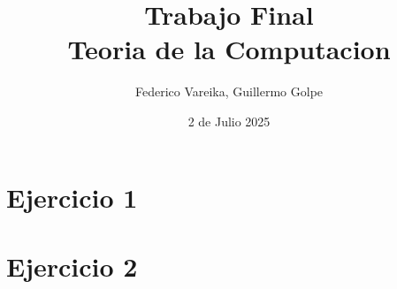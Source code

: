 \documentclass[12pt, a4paper]{article}
\title{
    {Trabajo Final}\\
    {\large Teoria de la Computacion}
}
\author{Federico Vareika, Guillermo Golpe}
\date{2 de Julio 2025}
\begin{document}
\maketitle

\newpage

\section*{Ejercicio 1}
\setcounter{section}{1}



\newpage

\section*{Ejercicio 2}
\setcounter{section}{2}



\newpage
\printbibliography
\end{document}
